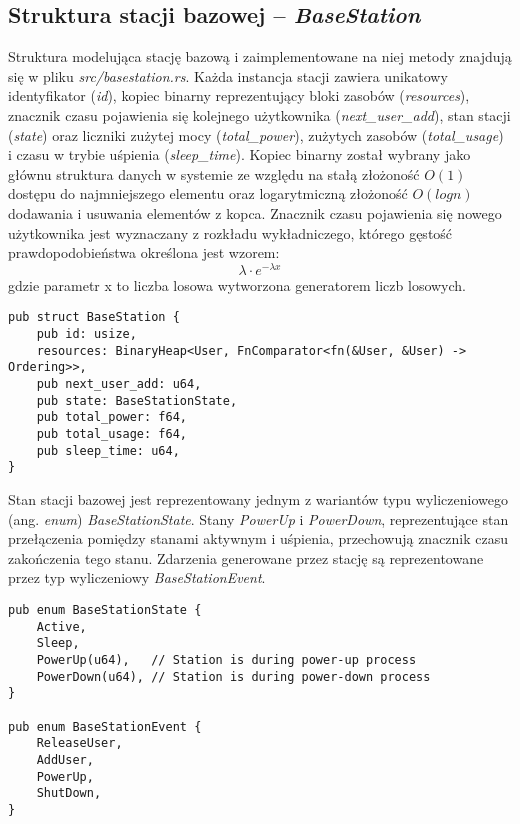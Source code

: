 \subsection{Struktura stacji bazowej -- \emph{BaseStation}}
Struktura modelująca stację bazową i zaimplementowane na niej metody znajdują się w pliku \emph{src/basestation.rs}. Każda instancja stacji zawiera unikatowy identyfikator (\emph{id}), kopiec binarny reprezentujący bloki zasobów (\emph{resources}), znacznik czasu pojawienia się kolejnego użytkownika (\emph{next\_user\_add}), stan stacji (\emph{state}) oraz liczniki zużytej mocy (\emph{total\_power}), zużytych zasobów (\emph{total\_usage}) i czasu w trybie uśpienia (\emph{sleep\_time}). Kopiec binarny został wybrany jako głównu struktura danych w systemie ze względu na stałą złożoność $O(1)$ dostępu do najmniejszego elementu oraz logarytmiczną złożoność $O(log{n})$ dodawania i usuwania elementów z kopca.
\newline\newline
\noindent Znacznik czasu pojawienia się nowego użytkownika jest wyznaczany z rozkładu wykładniczego, którego gęstość prawdopodobieństwa określona jest wzorem:
\[ \lambda \cdot e^{-\lambda x} \]
gdzie parametr x to liczba losowa wytworzona generatorem liczb losowych.

{
\selectfont 
\begin{verbatim}
pub struct BaseStation {
    pub id: usize,
    resources: BinaryHeap<User, FnComparator<fn(&User, &User) -> Ordering>>,
    pub next_user_add: u64,
    pub state: BaseStationState,
    pub total_power: f64,
    pub total_usage: f64,
    pub sleep_time: u64,
}
\end{verbatim}
}

\noindent Stan stacji bazowej jest reprezentowany jednym z wariantów typu wyliczeniowego (ang. \emph{enum}) \emph{BaseStationState}. Stany \emph{PowerUp} i \emph{PowerDown}, reprezentujące stan przełączenia pomiędzy stanami aktywnym i uśpienia, przechowują znacznik czasu zakończenia tego stanu. Zdarzenia generowane przez stację są reprezentowane przez typ wyliczeniowy \emph{BaseStationEvent}.
{
\selectfont 
\begin{verbatim}
pub enum BaseStationState {
    Active,
    Sleep,
    PowerUp(u64),   // Station is during power-up process
    PowerDown(u64), // Station is during power-down process
}

pub enum BaseStationEvent {
    ReleaseUser,
    AddUser,
    PowerUp,
    ShutDown,
}
\end{verbatim}
}


